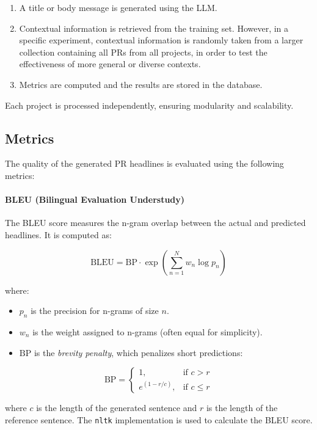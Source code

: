 \begin{enumerate}
\item A title or body message is generated using the LLM.
\item Contextual information is retrieved from the training set. However, in a specific experiment, contextual information is randomly taken from a larger collection containing all PRs from all projects, in order to test the effectiveness of more general or diverse contexts.
\item Metrics are computed and the results are stored in the database.
\end{enumerate}

Each project is processed independently, ensuring modularity and scalability.
\subsection{Metrics}

The quality of the generated PR headlines is evaluated using the following metrics:

\paragraph{BLEU (Bilingual Evaluation Understudy)}
The BLEU score measures the n-gram overlap between the actual and predicted headlines. It is computed as:

\begin{equation}
\text{BLEU} = \text{BP} \cdot \exp \left( \sum_{n=1}^{N} w_n \log p_n \right)
\end{equation}

where:
\begin{itemize}
    \item \( p_n \) is the precision for n-grams of size \( n \).
    \item \( w_n \) is the weight assigned to n-grams (often equal for simplicity).
    \item \( \text{BP} \) is the \textit{brevity penalty}, which penalizes short predictions:
\end{itemize}

\begin{equation}
\text{BP} =
\begin{cases}
1, & \text{if } c > r \\
e^{(1 - r/c)}, & \text{if } c \leq r
\end{cases}
\end{equation}

where \( c \) is the length of the generated sentence and \( r \) is the length of the reference sentence.
The \texttt{nltk} implementation is used to calculate the BLEU score.

